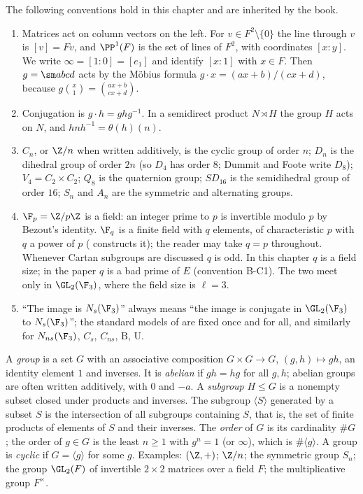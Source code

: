 \begin{convention}\label{conv:groups:conventions}
The following conventions hold in this chapter and are inherited by the book.
\begin{enumerate}[label=(C\arabic*)]
\item Matrices act on column vectors on the left. For $v\in F^2\setminus\{0\}$ the line through $v$ is $[v]=Fv$, and $\PP^1(F)$ is the set of
lines of $F^2$, with coordinates $[x:y]$. We write $\infty=[1:0]=[e_1]$ and identify $[x:1]$ with $x\in F$. Then
$g=\sm abcd$ acts by the M\"obius formula $g\cdot x=(ax+b)/(cx+d)$, because $g\binom x1=\binom{ax+b}{cx+d}$.
\item Conjugation is $g\cdot h=ghg^{-1}$. In a semidirect product $N\rtimes H$ the group $H$ acts on $N$, and $hnh^{-1}=\theta(h)(n)$.
\item $C_n$, or $\Z/n$ when written additively, is the cyclic group of order $n$; $D_n$ is the dihedral group of order $2n$ (so $D_4$
has order $8$; Dummit and Foote write $D_8$); $V_4=C_2\times C_2$; $Q_8$ is the quaternion group; $SD_{16}$ is the semidihedral group
of order $16$; $S_n$ and $A_n$ are the symmetric and alternating groups.
\item $\F_p=\Z/p\Z$ is a field: an integer prime to $p$ is invertible modulo $p$ by Bezout's identity. $\F_q$ is a finite field with
$q$ elements, of characteristic $p$ with $q$ a power of $p$ ( constructs it); the reader may take $q=p$
throughout. Whenever Cartan subgroups are discussed $q$ is odd. In this chapter $q$ is a field size; in the paper $q$ is a bad prime
of $E$ (convention B-C1). The two meet only in $\GL_2(\F_3)$, where the field size is $\ell=3$.
\item ``The image is $N_s(\F_3)$'' always means ``the image is conjugate in $\GL_2(\F_3)$ to $N_s(\F_3)$''; the standard models of
 are fixed once and for all, and similarly for $N_{ns}(\F_3)$, $C_s$, $C_{ns}$, $\mathrm B$, $\mathrm U$.
\end{enumerate}
\end{convention}

\begin{definition}\label{def:groups:group}
A \emph{group} is a set $G$ with an associative composition $G\times G\to G$, $(g,h)\mapsto gh$, an identity element $1$ and inverses.
It is \emph{abelian} if $gh=hg$ for all $g,h$; abelian groups are often written additively, with $0$ and $-a$. A \emph{subgroup} $H\le G$
is a nonempty subset closed under products and inverses. The subgroup $\langle S\rangle$ generated by a subset $S$ is the intersection of
all subgroups containing $S$, that is, the set of finite products of elements of $S$ and their inverses. The \emph{order} of $G$ is
its cardinality $\#G$; the order of $g\in G$ is the least $n\ge1$ with $g^n=1$ (or $\infty$), which is $\#\langle g\rangle$. A group is \emph{cyclic}
if $G=\langle g\rangle$ for some $g$. Examples: $(\Z,+)$; $\Z/n$; the symmetric group $S_n$; the group $\GL_2(F)$ of invertible $2\times2$
matrices over a field $F$; the multiplicative group $F^\times$.
\end{definition}


